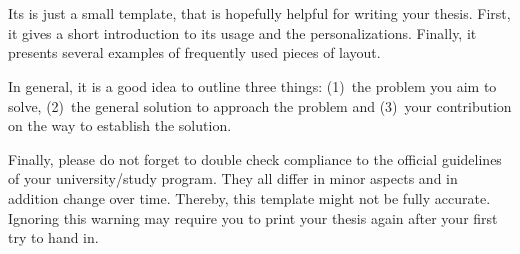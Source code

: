 \documentclass[../main.tex]{subfiles}
\begin{document}
\chapter*{\myAbstractTitle}

Its is just a small template, that is hopefully helpful for writing your thesis.
First, it gives a short introduction to its usage and the personalizations.
Finally, it presents several examples of frequently used pieces of layout.

In general, it is a good idea to outline three things:
(1)~the problem you aim to solve,
(2)~the general solution to approach the problem and
(3)~your contribution on the way to establish the solution.

Finally, please do not forget to double check compliance to the official guidelines of your university/study program.
They all differ in minor aspects and in addition change over time.
Thereby, this template might not be fully accurate.
Ignoring this warning may require you to print your thesis again after your first try to hand in.
\end{document}
